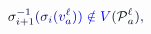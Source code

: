 \documentclass[12pt]{article}
\begin{document}
\makeatletter
\renewcommand*{\@textcolor}[3]{%
  \protect\leavevmode
  \begingroup
    \color#1{#2}#3%
  \endgroup
}
\makeatother
\begin{displaymath}
\mathcolor[RGB]{0,0,15}{\sigma} _ { \mathcolor[RGB]{0,0,30}{i} \mathcolor[RGB]{0,0,45}{+} \mathcolor[RGB]{0,0,60}{1} } ^ { \mathcolor[RGB]{0,0,75}{-} \mathcolor[RGB]{0,0,90}{1} } \mathcolor[RGB]{0,0,105}{(} \mathcolor[RGB]{0,0,120}{\sigma} _ { \mathcolor[RGB]{0,0,135}{i} } \mathcolor[RGB]{0,0,150}{(} \mathcolor[RGB]{0,0,165}{v} _ { \mathcolor[RGB]{0,0,180}{a} } ^ { \mathcolor[RGB]{0,0,195}{\ell} } \mathcolor[RGB]{0,0,210}{)} \mathcolor[RGB]{0,0,225}{)} \mathcolor[RGB]{0,0,240}{\notin} \mathcolor[RGB]{0,0,255}{V} \mathcolor[RGB]{0,15,0}{(} \mathcal { \mathcolor[RGB]{0,15,15}{P} } _ { \mathcolor[RGB]{0,15,30}{a} } ^ { \mathcolor[RGB]{0,15,45}{\ell} } \mathcolor[RGB]{0,15,60}{)} \mathcolor[RGB]{0,15,75}{,}
\end{displaymath}
\end{document}
